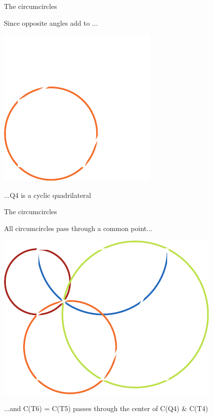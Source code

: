 \documentclass[14pt]{beamer}
\begin{document}

    \begin{frame}{The circumcircles}
        \begin{center}
            Since opposite angles add to \textpi...
        \end{center}
        \vspace{0.90em}
        \hspace{5.25em} \includegraphics[scale=1.]{figures/figure019b.pdf} \\
        \begin{center}
            ...Q4 is a cyclic quadrilateral
        \end{center}
    \end{frame}


    \begin{frame}{The circumcircles}
        \begin{center}
            All circumcircles pass through a common point...
        \end{center}
        \hspace{3.92em} \includegraphics[scale=1.0]{figures/figure019c.pdf} \\
        \begin{center}
            \footnotesize ...and C(T6) = C(T5) passes through the center of C(Q4) \& C(T4)
        \end{center}
    \end{frame}
\end{document}
